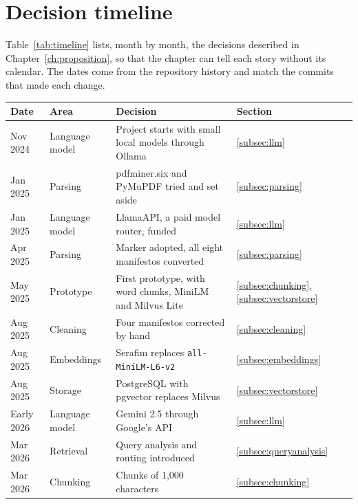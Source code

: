 \chapter{Decision timeline} \label{app:timeline}

Table~\ref{tab:timeline} lists, month by month, the decisions described in
Chapter~\ref{ch:proposition}, so that the chapter can tell each story without
its calendar. The dates come from the repository history and match the
commits that made each change.

\begin{table}[p]
    \centering
    \footnotesize
    \begin{tabular}{|l|l|p{}|l|}
        \hline
        \textbf{Date} & \textbf{Area} & \textbf{Decision} & \textbf{Section} \\
        \hline
        Nov 2024 & Language model & Project starts with small local models through Ollama & \ref{subsec:llm} \\
        Jan 2025 & Parsing & pdfminer.six and PyMuPDF tried and set aside & \ref{subsec:parsing} \\
        Jan 2025 & Language model & LlamaAPI, a paid model router, funded & \ref{subsec:llm} \\
        Apr 2025 & Parsing & Marker adopted, all eight manifestos converted & \ref{subsec:parsing} \\
        May 2025 & Prototype & First prototype, with word chunks, MiniLM and Milvus Lite & \ref{subsec:chunking}, \ref{subsec:vectorstore} \\
        Aug 2025 & Cleaning & Four manifestos corrected by hand & \ref{subsec:cleaning} \\
        Aug 2025 & Embeddings & Serafim replaces \texttt{all-MiniLM-L6-v2} & \ref{subsec:embeddings} \\
        Aug 2025 & Storage & PostgreSQL with pgvector replaces Milvus & \ref{subsec:vectorstore} \\
        Early 2026 & Language model & Gemini 2.5 through Google's API & \ref{subsec:llm} \\
        Mar 2026 & Retrieval & Query analysis and routing introduced & \ref{subsec:queryanalysis} \\
        Mar 2026 & Chunking & Chunks of 1{,}000 characters & \ref{subsec:chunking} \\

\end{tabular}
\end{table}

